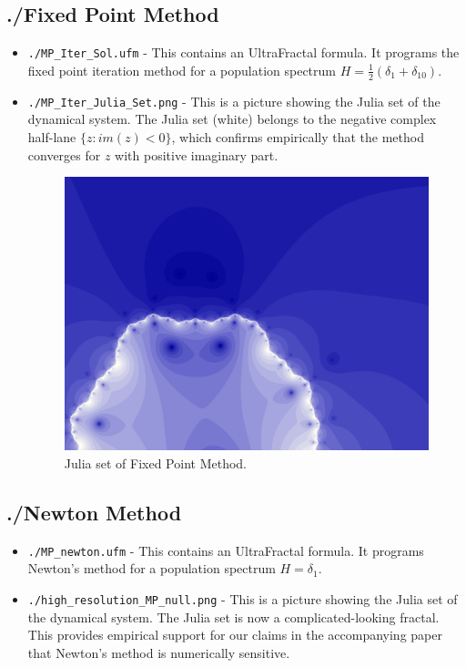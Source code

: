 \documentclass[english,11pt]{article} %
\begin{document}
\subsection{ ./Fixed Point Method}
\begin{itemize}
\item \verb+./MP_Iter_Sol.ufm+ - This contains an UltraFractal formula. It programs the fixed
point iteration method for a population spectrum $H = \frac{1}{2}(\delta_1 + \delta_{10})$.
\item \verb+./MP_Iter_Julia_Set.png+ - This is a picture showing the Julia set of the dynamical
system. The Julia set (white) belongs to the negative complex half-lane $\{z: im(z)<0\}$, which
confirms empirically that the method converges for $z$ with positive imaginary part.

\begin{figure}
\centering
  \includegraphics[scale=1]{"../Experiments/Fractals/Fixed Point Method/MP_Iter_Julia_Set"}
\caption{Julia set of Fixed Point Method.}
\label{fig1}
\end{figure}

\end{itemize}

\subsection{ ./Newton Method}
\begin{itemize}
\item \verb+./MP_newton.ufm+ - This contains an UltraFractal formula. It programs Newton's 
method for a population spectrum $H =\delta_1$.
\item \verb+./high_resolution_MP_null.png+ - This is a picture showing the Julia set of the dynamical
system. The Julia set is now a complicated-looking fractal. This provides empirical
support for our claims in the accompanying paper that Newton's method is numerically sensitive.
\end{itemize}
\end{document}

